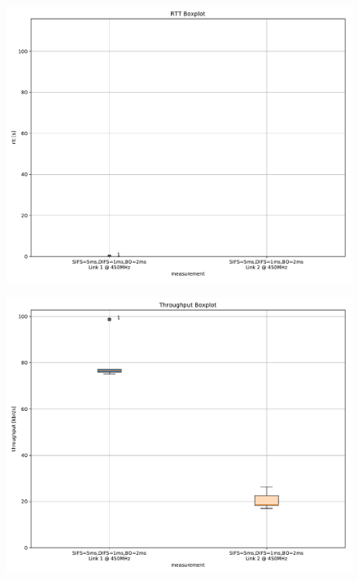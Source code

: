 \documentclass{article}
\begin{document}
\begin{figure}
	\includegraphics[width=\textwidth]{rb_low_dual/boxplot/rtt_boxplot}
\end{figure}

\begin{figure}
	\includegraphics[width=\textwidth]{rb_low_dual/boxplot/throughput_boxplot}
\end{figure}
\end{document}
